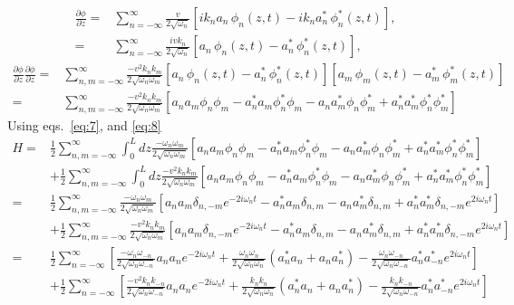 \begin{align}
  \frac{\partial\phi}{\partial z}=&\sum_{n=-\infty}^\infty \frac{v}{2\sqrt{\omega_n}}
  \left[ik_n a_n\,\phi_n(z,t)-ik_n a_n^*\,\phi_n^*(z,t)\right],\nonumber\\
=&\sum_{n=-\infty}^\infty\frac{i vk_n}{2\sqrt{\omega_n}}
  \left[a_n\,\phi_n(z,t)- a_n^*\,\phi_n^*(z,t)\right],
\end{align}
\begin{align}
   \frac{\partial\phi}{\partial z} \frac{\partial\phi}{\partial z}=&
\sum_{n,m=-\infty}^\infty\frac{-v^2 k_nk_m}{2\sqrt{\omega_n\omega_m}}
  \left[a_n\,\phi_n(z,t)- a_n^*\,\phi_n^*(z,t)\right]
\left[a_m\,\phi_m(z,t)- a_m^*\,\phi_m^*(z,t)\right]\\
=  &
\sum_{n,m=-\infty}^\infty\frac{- v^2k_nk_m}{2\sqrt{\omega_n\omega_m}}
  \left[a_n a_m \phi_n \phi_m- a_n^*a_m\phi_n^*\phi_m-a_n a_m^* \phi_n \phi_m^*+ a_n^*a_m^*\phi_n^*\phi_m^*\right]
\end{align}
Using eqs.~\eqref{eq:7}, and \eqref{eq:8}
\begin{align}
  H=  &\frac12
\sum_{n,m=-\infty}^\infty\int_0^Ldz\frac{- \omega_n\omega_m}{2\sqrt{\omega_n\omega_m}} 
  \left[a_n a_m \phi_n \phi_m- a_n^*a_m\phi_n^*\phi_m-a_n a_m^* \phi_n \phi_m^*+ a_n^*a_m^*\phi_n^*\phi_m^*\right]\nonumber\\
&+\frac12\sum_{n,m=-\infty}^\infty\int_0^Ldz \frac{- v^2k_nk_m}{2\sqrt{\omega_n\omega_m}}
  \left[a_n a_m \phi_n \phi_m- a_n^*a_m\phi_n^*\phi_m-a_n a_m^* \phi_n \phi_m^*+ a_n^*a_m^*\phi_n^*\phi_m^*\right]\nonumber\\
  =  &\frac12
\sum_{n,m=-\infty}^\infty\frac{- \omega_n\omega_m}{2\sqrt{\omega_n\omega_m}} 
  \left[a_n a_m \delta_{n,-m}e^{-2i\omega_n t}- a_n^*a_m\delta_{n, m}-a_n a_m^* \delta_{n,m}+ a_n^*a_m^*\delta_{n,-m}e^{2i\omega_n t}\right] \nonumber\\
  &+\frac12
\sum_{n,m=-\infty}^\infty\frac{-v^2 k_nk_m}{2\sqrt{\omega_n\omega_m}} 
  \left[a_n a_m \delta_{n,-m}e^{-2i\omega_n t}- a_n^*a_m\delta_{n, m}-a_n a_m^* \delta_{n,m}+ a_n^*a_m^*\delta_{n,-m}e^{2i\omega_n t}\right]\nonumber\\
  =  &\frac12
\sum_{n=-\infty}^\infty 
  \left[\frac{- \omega_n\omega_{-n}}{2\sqrt{\omega_n\omega_{-n}}}a_n a_n e^{-2i\omega_n t}
+\frac{ \omega_n\omega_n}{2\sqrt{\omega_n\omega_n}}(a_n^*a_n+a_n a_n^*)- \frac{\omega_n\omega_{-n}}{2\sqrt{\omega_n\omega_{-n}}} a_n^*a_{-n}^*e^{2i\omega_n t}\right]\nonumber\\
&+\frac12
\sum_{n=-\infty}^\infty 
  \left[\frac{-v^2 k_nk_{-n}}{2\sqrt{\omega_n\omega_{-n}}}a_n a_n e^{-2i\omega_n t}
+\frac{ k_nk_n}{2\sqrt{\omega_n\omega_n}}(a_n^*a_n+a_n a_n^*)- \frac{k_nk_{-n}}{2\sqrt{\omega_n\omega_{-n}}} a_n^*a_{-n}^*e^{2i\omega_n t}\right]
\end{align}
